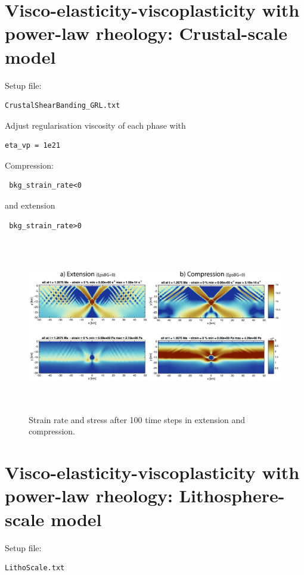 \documentclass[12pt,english,openany]{scrbook}
\begin{document}
\section{Visco-elasticity-viscoplasticity with power-law rheology: Crustal-scale model}

Setup file:
\begin{verbatim} 
CrustalShearBanding_GRL.txt
\end{verbatim}

Adjust regularisation viscosity of each phase with
\begin{verbatim} 
eta_vp = 1e21
\end{verbatim}

Compression: \begin{verbatim} bkg_strain_rate<0 \end{verbatim}
and extension \begin{verbatim} bkg_strain_rate>0 \end{verbatim}

\begin{figure}[ht!]
\centerline{\includegraphics[height=3.0in]{./Figures/Extension_Compression_MDOODZ.png}}
\caption{Strain rate and stress after 100 time steps in extension and compression.}
\label{Extension_Compression_MDOODZ}
\end{figure}

\section{Visco-elasticity-viscoplasticity with power-law rheology: Lithosphere-scale model}

Setup file:
\begin{verbatim} 
LithoScale.txt
\end{verbatim}
\end{document}
